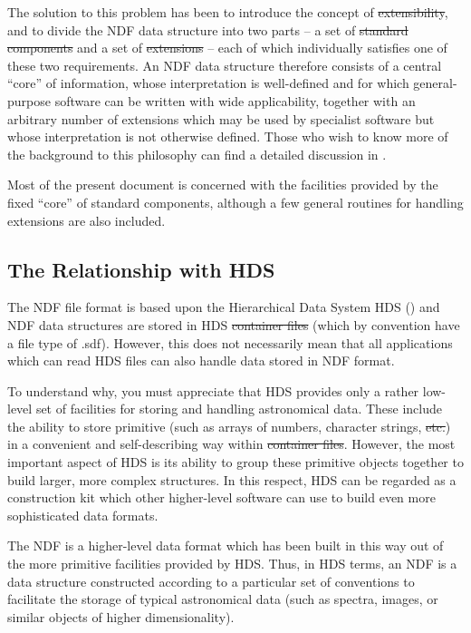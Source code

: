 The solution to this problem has been to introduce the concept of
\st{extensibility}, and to divide the NDF data structure into two
parts -- a set
of \st{standard components\/} and a set of \st{extensions\/} -- each of which
individually satisfies one of these two requirements. 
An NDF data structure therefore consists of a central ``core'' of
information, whose interpretation is well-defined and for which
general-purpose software can be written with wide applicability, together
with an arbitrary number of extensions which may be used by specialist
software but whose interpretation is not otherwise defined. 
Those who wish to know more of the background to this philosophy can find a 
detailed discussion in .

Most of the present document is concerned with the facilities provided by
the fixed ``core'' of standard components, although a few general routines
for handling extensions are also included. 

\subsection{The Relationship with HDS}

The NDF file format is based upon the Hierarchical Data System HDS
() and NDF data structures are stored in HDS
\st{container files\/} (which by convention have a file type of
.sdf).  However, this does not necessarily mean that all applications
which can read HDS files can also handle data stored in NDF format.

To understand why, you must appreciate that HDS provides only a rather
low-level set of facilities for storing and handling astronomical data.
These include the ability to store primitive  (such as arrays of numbers, character
strings, \st{etc.}) in a convenient and self-describing way within
\st{container files}.
However, the most important aspect of HDS is its ability to group these
primitive objects together to build larger, more complex structures. 
In this respect, HDS can be regarded as a construction kit which other
higher-level software can use to build even more sophisticated data formats.

The NDF is a higher-level data format which has been built in this way out 
of the more primitive facilities provided by HDS.
Thus, in HDS terms, an NDF is a data structure constructed according to a
particular set of conventions to facilitate the storage of typical
astronomical data (such as spectra, images, or similar objects of higher
dimensionality). 

